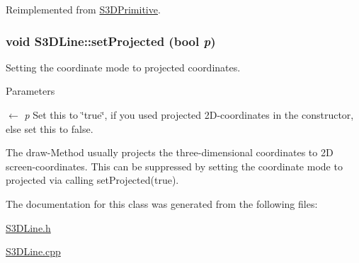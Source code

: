Reimplemented from \hyperlink{class_s3_d_primitive_a1c8f036193987522bdfb6a49b9b74000}{S3DPrimitive}.

\hypertarget{class_s3_d_line_a3b973e5206d4bed73b797b4c5afe8dec}{
\subsubsection[{setProjected}]{\setlength{\rightskip}{0pt plus 5cm}void S3DLine::setProjected (bool {\em p})}}
\label{class_s3_d_line_a3b973e5206d4bed73b797b4c5afe8dec}


Setting the coordinate mode to projected coordinates. 


\begin{DoxyParams}{Parameters}
\item[\mbox{$\leftarrow$} {\em p}]Set this to \char`\"{}true\char`\"{}, if you used projected 2D-\/coordinates in the constructor, else set this to false.\end{DoxyParams}
The draw-\/Method usually projects the three-\/dimensional coordinates to 2D screen-\/coordinates. This can be suppressed by setting the coordinate mode to projected via calling setProjected(true). 

The documentation for this class was generated from the following files:\begin{DoxyCompactItemize}
\item 
\hyperlink{_s3_d_line_8h}{S3DLine.h}\item 
\hyperlink{_s3_d_line_8cpp}{S3DLine.cpp}\end{DoxyCompactItemize}
